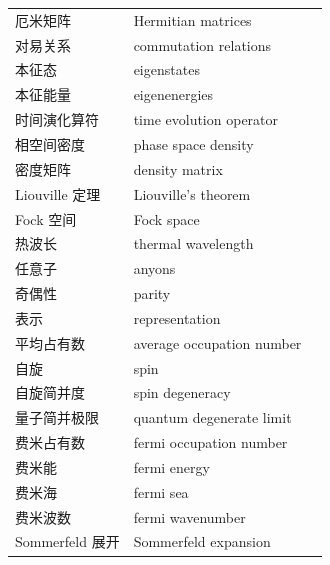 \begin{xltabular}{\textwidth}{@{}l l c@{}}
  厄米矩阵 & {\glossaryfont Hermitian matrices} & \pageref{term:6.hermitian-matrix} \\
  对易关系 & {\glossaryfont commutation relations} & \pageref{term:6.commutation-relations} \\
  本征态 & {\glossaryfont eigenstates} & \pageref{term:6.eigenstates} \\
  本征能量 & {\glossaryfont eigenenergies} & \pageref{term:6.eigenenergies} \\
  时间演化算符 & {\glossaryfont time evolution operator} & \pageref{term:6.time-evolution-operator} \\
  相空间密度 & {\glossaryfont phase space density} & \pageref{term:6.phase-space-density} \\
  密度矩阵 & {\glossaryfont density matrix} & \pageref{term:6.density-matrix} \\
  Liouville 定理 & {\glossaryfont Liouville's theorem} & \pageref{term:6.liouville-theorem} \\
  Fock 空间 & {\glossaryfont Fock space} & \pageref{term:6.fock-space} \\
  热波长 & {\glossaryfont thermal wavelength} & \pageref{term:6.thermal-wavelength} \\
  任意子 & {\glossaryfont anyons} & \pageref{term:7.anyons} \\
  奇偶性 & {\glossaryfont parity} & \pageref{term:7.parity} \\
  表示 & {\glossaryfont representation} & \pageref{term:7.representation} \\
  平均占有数 & {\glossaryfont average occupation number} & \pageref{term:7.avg-occ-number} \\
  自旋 & {\glossaryfont spin} & \pageref{term:7.spin} \\
  自旋简并度 & {\glossaryfont spin degeneracy} & \pageref{term:7.spin-degeneracy} \\
  量子简并极限 & {\glossaryfont quantum degenerate limit} & \pageref{term:7.quantum-degenerate-limit} \\
  费米占有数 & {\glossaryfont fermi occupation number} & \pageref{term:7.fermi-occ-number} \\
  费米能 & {\glossaryfont fermi energy} & \pageref{term:7.fermi-energy} \\
  费米海 & {\glossaryfont fermi sea} & \pageref{term:7.fermi-sea} \\
  费米波数 & {\glossaryfont fermi wavenumber} & \pageref{term:7.fermi-wavenumber} \\
  Sommerfeld 展开 & {\glossaryfont Sommerfeld expansion} & \pageref{term:7.sommerfeld-expansion} \\

\end{xltabular}
